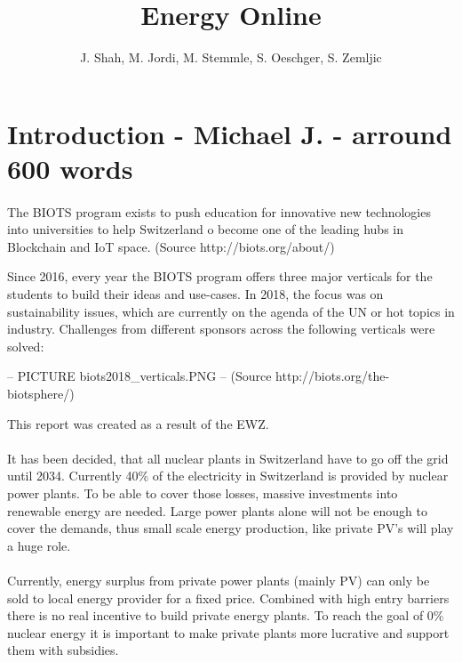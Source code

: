 \documentclass{scrartcl}
\begin{document}
	
	\title{Energy Online}
	\subtitle{}
	\author{J. Shah, M. Jordi, M. Stemmle, S. Oeschger, S. Zemljic}
	
	\maketitle
	\section{Introduction - Michael J. - arround 600 words}
    \paragraph{}
   The BIOTS program exists to push education for innovative new technologies into universities to help Switzerland o become one of the leading hubs in Blockchain and IoT space. (Source http://biots.org/about/)
   
    Since 2016, every year the BIOTS program offers three major verticals for the students to build their ideas and use-cases. In 2018, the focus was on sustainability issues, which are currently on the agenda of the UN or hot topics in industry. Challenges from different sponsors across the following verticals were solved:
    
    -- PICTURE biots2018\_verticals.PNG -- (Source http://biots.org/the-biotsphere/)
    
    This  report was created as a result of the EWZ. 
    
    \paragraph{}
    It has been decided, that all nuclear plants in Switzerland have to go off the grid until 2034. Currently 40\% of the electricity in Switzerland is provided by nuclear power plants. To be able to cover those losses, massive investments into renewable energy are needed. Large power plants alone will not be enough to cover the demands, thus small scale energy production, like private PV's will play a huge role.
    \paragraph{}
    Currently, energy surplus from private power plants (mainly PV) can only be sold to local energy provider for a fixed price. Combined with high entry barriers there is no real incentive to build private energy plants.
	To reach the goal of 0\% nuclear energy it is important to make private plants more lucrative and support them with subsidies. 
    
\end{document}
